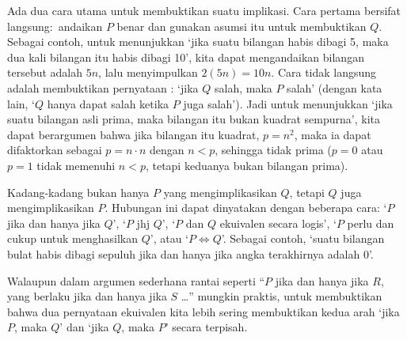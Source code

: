 Ada dua cara utama untuk membuktikan suatu implikasi.
Cara pertama bersifat langsung:~andaikan \( P \) benar dan gunakan
asumsi itu untuk membuktikan \( Q \).
Sebagai contoh, untuk menunjukkan `jika suatu bilangan habis dibagi 5,
maka dua kali bilangan itu habis dibagi 10', kita dapat mengandaikan
bilangan tersebut adalah \( 5n \), lalu menyimpulkan \( 2(5n)=10n \).
Cara tidak langsung adalah membuktikan pernyataan
:
`jika \( Q \) salah, maka \( P \) salah'
(dengan kata lain, `\( Q \) hanya dapat salah ketika \( P \) juga salah').
Jadi untuk menunjukkan `jika suatu bilangan asli prima, maka bilangan itu
bukan kuadrat sempurna', kita dapat berargumen bahwa jika bilangan itu
kuadrat, \( p=n^2 \), maka ia dapat difaktorkan sebagai
\( p=n\cdot n \) dengan \( n<p \), sehingga tidak prima
(\( p=0 \) atau \( p=1 \) tidak memenuhi \( n<p \), tetapi keduanya
bukan bilangan prima).






Kadang-kadang bukan hanya \( P \) yang mengimplikasikan \( Q \), tetapi
\( Q \) juga mengimplikasikan \( P \).
Hubungan ini dapat dinyatakan dengan beberapa cara:
`\( P \) jika dan hanya jika \( Q \)', `\( P \) jhj \( Q \)',
`\( P \) dan \( Q \) ekuivalen secara logis',
`\( P \) perlu dan cukup untuk menghasilkan \( Q \)', atau
`\( P\iff Q \)'.
Sebagai contoh, `suatu bilangan bulat habis dibagi sepuluh jika dan hanya
jika angka terakhirnya adalah $0$'.

Walaupun dalam argumen sederhana rantai seperti
``\( P \) jika dan hanya jika $R$, yang berlaku jika dan hanya jika
$S$ \ldots'' mungkin praktis, untuk membuktikan bahwa dua pernyataan
ekuivalen kita lebih sering membuktikan kedua arah
`jika \( P \), maka \( Q \)' dan `jika \( Q \), maka \( P \)' secara terpisah.








